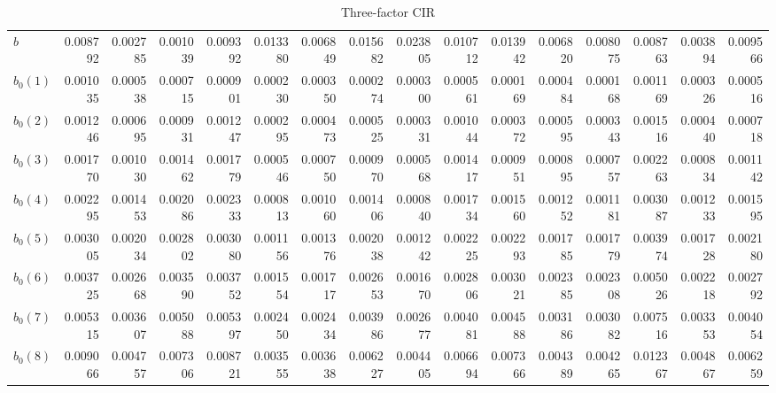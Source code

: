 \documentclass[12pt,a4paper]{article}
\theoremstyle{plain}
\numberwithin{equation}{section}
\begin{document}
\begin{table}[t]
\begin{subtable}{.5\textwidth}
{\begin{tabular}{|l|rrrrrrrrrrrrrr|r|}
    $\hat{b}$     & 0.008792 & 0.002785 & 0.001039 & 0.009392 & 0.013380 & 0.006849 & 0.015682 & 0.023805 & 0.010712 & 0.013942 & 0.006820 & 0.008075 & 0.008763 & 0.003894 & 0.009566 \\
     $\hat{b}_0(1)$   & 0.001035 & 0.000538 & 0.000715 & 0.000901 & 0.000230 & 0.000350 & 0.000274 & 0.000300 & 0.000561 & 0.000169 & 0.000484 & 0.000168 & 0.001169 & 0.000326 & 0.000516 \\
     $\hat{b}_0(2)$  & 0.001246 & 0.000695 & 0.000931 & 0.001247 & 0.000295 & 0.000473 & 0.000525 & 0.000331 & 0.001044 & 0.000372 & 0.000595 & 0.000343 & 0.001516 & 0.000440 & 0.000718 \\
    $\hat{b}_0(3)$  & 0.001770 & 0.001030 & 0.001462 & 0.001779 & 0.000546 & 0.000750 & 0.000970 & 0.000568 & 0.001417 & 0.000951 & 0.000895 & 0.000757 & 0.002263 & 0.000834 & 0.001142 \\
    $\hat{b}_0(4)$  & 0.002295 & 0.001453 & 0.002086 & 0.002333 & 0.000813 & 0.001060 & 0.001406 & 0.000840 & 0.001734 & 0.001560 & 0.001252 & 0.001181 & 0.003087 & 0.001233 & 0.001595 \\
    $\hat{b}_0(5)$   & 0.003005 & 0.002034 & 0.002802 & 0.003080 & 0.001156 & 0.001376 & 0.002038 & 0.001242 & 0.002225 & 0.002293 & 0.001785 & 0.001779 & 0.003974 & 0.001728 & 0.002180 \\
    $\hat{b}_0(6)$   & 0.003725 & 0.002668 & 0.003590 & 0.003752 & 0.001554 & 0.001717 & 0.002653 & 0.001670 & 0.002806 & 0.003021 & 0.002385 & 0.002308 & 0.005026 & 0.002218 & 0.002792 \\
    $\hat{b}_0(7)$  & 0.005315 & 0.003607 & 0.005088 & 0.005397 & 0.002450 & 0.002434 & 0.003986 & 0.002677 & 0.004081 & 0.004588 & 0.003186 & 0.003082 & 0.007516 & 0.003353 & 0.004054 \\
    $\hat{b}_0(8)$  & 0.009066 & 0.004757 & 0.007306 & 0.008721 & 0.003555 & 0.003638 & 0.006227 & 0.004405 & 0.006694 & 0.007366 & 0.004389 & 0.004265 & 0.012367 & 0.004867 & 0.006259 \\

    \bottomrule
    \end{tabular}%
    }
  \label{tab:addlabel}%
  \end{subtable}

  \begin{subtable}{.5\textwidth}
  \centering
  \caption{Three-factor CIR}
\end{subtable}
\end{table}
\end{document}
